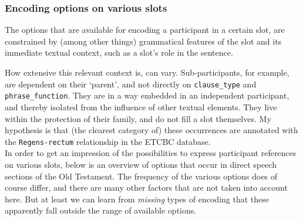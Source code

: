\documentclass{report}
\newcommand{\mi}[1]{\lstinline{#1}}
\begin{document}
\subsubsection{Encoding options on various slots}
The options that are available for encoding a participant in a certain slot, are constrained by (among other things) grammatical features of the slot and its immediate textual context, such as a slot's role in the sentence.

How extensive this relevant context is, can vary. Sub-participants, for example, are dependent on their `parent', and not directly on \mi{clause_type} and \mi{phrase_function}. They are in a way embedded in an independent participant, and thereby isolated from the influence of other textual elements. They live within the protection of their family, and do not fill a slot themselves. My hypothesis is that (the clearest category of) these occurrences are annotated with the \mi{Regens-rectum} relationship in the ETCBC database.\\

In order to get an impression of the possibilities to express participant references on various slots, below is an overview of options that occur in direct speech sections of the Old Testament. The frequency of the various options does of course differ, and there are many other factors that are not taken into account here. But at least we can learn from \emph{missing} types of encoding that these apparently fall outside the range of available options.
\end{document}
